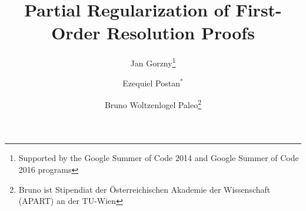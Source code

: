 \documentclass{easychair}
\title{Partial Regularization of First-Order Resolution Proofs}
\author{Jan Gorzny\inst{1}\thanks{Supported by the Google Summer of Code 2014 and Google Summer of Code 2016 programs}
\and
Ezequiel Postan\inst{2}$^{*}$
\and
Bruno Woltzenlogel Paleo\inst{3}\thanks{Bruno ist Stipendiat der \"Osterreichischen Akademie der Wissenschaft (APART) an der TU-Wien}
}
\institute{%
University of Waterloo, Waterloo, ON, Canada\\
\email{jgorzny@uwaterloo.ca}
\and
Universidad Nacional de Rosario, Rosario, Santa Fe, Argentina\\
\email{ezequiel@fceia.unr.edu.ar}
\and
Vienna University of Technology, Vienna, Austria\\
\email{bruno@logic.at}
}
\theoremstyle{definition}
\begin{document}
  \maketitle


\begin{abstract}
 
\end{abstract}


\sloppy  %

\setcounter{footnote}{0}
\newcommand{\la}{\leftarrow}




 









\begin{footnotesize}


\end{footnotesize}
\end{document}
